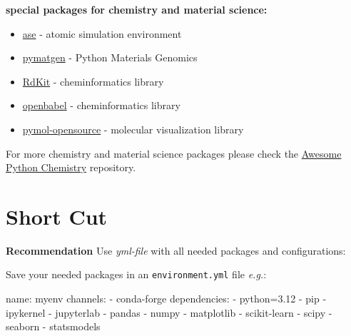 \documentclass[
  letterpaper,
  DIV=11,
  numbers=noendperiod]{scrreprt}
\newenvironment{Shaded}{\begin{snugshade}}{\end{snugshade}}
\newcommand{\NormalTok}[1]{\textcolor[rgb]{0.00,0.23,0.31}{#1}}
\providecommand{\tightlist}{%
  \setlength{\itemsep}{0pt}\setlength{\parskip}{0pt}}\usepackage{longtable,booktabs,array}
\begin{document}
\textbf{special packages for chemistry and material science:}

\begin{itemize}
\tightlist
\item
  \href{https://wiki.fysik.dtu.dk/ase/}{ase} - atomic simulation
  environment
\item
  \href{https://pymatgen.org/}{pymatgen} - Python Materials Genomics
\item
  \href{https://www.rdkit.org/docs/index.html}{RdKit} - cheminformatics
  library
\item
  \href{https://openbabel.org/index.html}{openbabel} - cheminformatics
  library
\item
  \href{https://pymol.org/\#opensource}{pymol-opensource} - molecular
  visualization library
\end{itemize}

For more chemistry and material science packages please check the
\href{https://github.com/lmmentel/awesome-python-chemistry}{Awesome
Python Chemistry} repository.

\section*{Short Cut}\label{short-cut}


\begin{tcolorbox}[enhanced jigsaw, leftrule=.75mm, bottomrule=.15mm, colbacktitle=quarto-callout-tip-color!10!white, title=\textcolor{quarto-callout-tip-color}{\faLightbulb}\hspace{0.5em}{Tip}, breakable, arc=.35mm, toptitle=1mm, opacityback=0, titlerule=0mm, coltitle=black, colback=white, opacitybacktitle=0.6, colframe=quarto-callout-tip-color-frame, left=2mm, rightrule=.15mm, toprule=.15mm, bottomtitle=1mm]

\textbf{Recommendation} Use \emph{yml-file} with all needed packages and
configurations:

\end{tcolorbox}

Save your needed packages in an \texttt{environment.yml} file
\emph{e.g.}:

\begin{Shaded}
\begin{Highlighting}[]
\NormalTok{name: myenv}
\NormalTok{channels:}
\NormalTok{ {-} conda{-}forge}
\NormalTok{dependencies:}
\NormalTok{ {-} python=3.12}
\NormalTok{ {-} pip}
\NormalTok{ {-} ipykernel}
\NormalTok{ {-} jupyterlab}
\NormalTok{ {-} pandas}
\NormalTok{ {-} numpy}
\NormalTok{ {-} matplotlib}
\NormalTok{ {-} scikit{-}learn}
\NormalTok{ {-} scipy}
\NormalTok{ {-} seaborn}
\NormalTok{ {-} statsmodels}
\end{Highlighting}
\end{Shaded}
\end{document}

